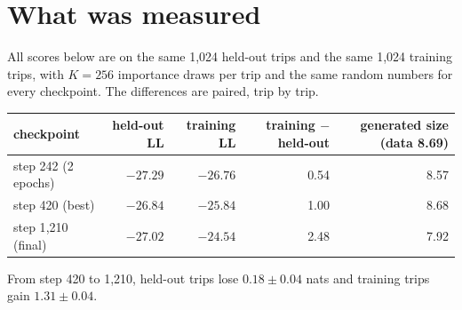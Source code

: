 \documentclass[11pt]{article}
\theoremstyle{remark}\newtheorem{remark}{Remark}
\begin{document}
\section{What was measured}

All scores below are on the same 1{,}024 held-out trips and the same 1{,}024 training trips, with
$K=256$ importance draws per trip and the same random numbers for every checkpoint. The
differences are paired, trip by trip.

\begin{center}\small
\begin{tabular}{lrrrr}\toprule
checkpoint & held-out LL & training LL & training $-$ held-out & generated size (data 8.69)\\\midrule
step 242 (2 epochs) & $-27.29$ & $-26.76$ & 0.54 & 8.57\\
step 420 (best)     & $-26.84$ & $-25.84$ & 1.00 & 8.68\\
step 1{,}210 (final)& $-27.02$ & $-24.54$ & 2.48 & 7.92\\\bottomrule
\end{tabular}
\end{center}
From step 420 to 1{,}210, held-out trips lose $0.18\pm0.04$ nats and training trips gain
$1.31\pm0.04$.
\end{document}
